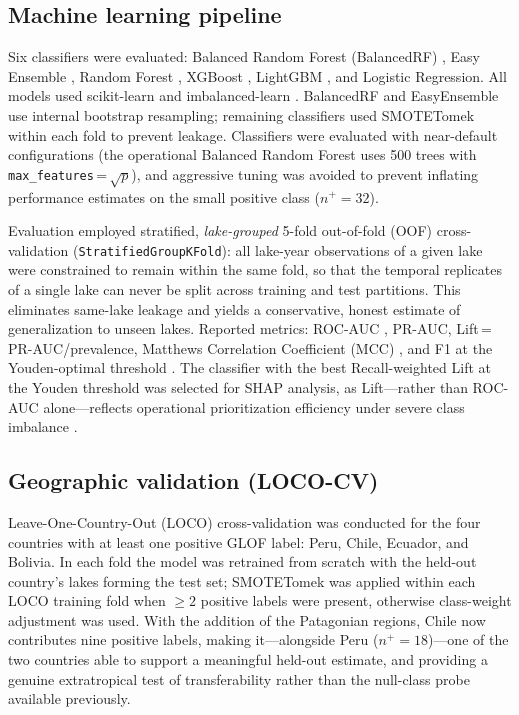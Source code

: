 \documentclass[pdflatex,sn-basic]{sn-jnl}%
\begin{document}
\subsection{Machine learning pipeline}\label{sec:pipeline}

Six classifiers were evaluated: Balanced Random Forest (BalancedRF)
\citep{Chen2004}, Easy Ensemble \citep{Liu2009}, Random Forest
\citep{Breiman2001}, XGBoost \citep{Chen2016}, LightGBM \citep{Ke2017},
and Logistic Regression. All models used scikit-learn
\citep{Pedregosa2011} and imbalanced-learn \citep{Lemaitre2017}.
BalancedRF and EasyEnsemble use internal bootstrap resampling;
remaining classifiers used SMOTETomek \citep{Chawla2002} within each
fold to prevent leakage. Classifiers were evaluated with near-default
configurations (the operational Balanced Random Forest uses 500 trees with
\texttt{max\_features}\,=\,$\sqrt{p}$), and aggressive tuning was avoided
to prevent inflating performance estimates on the small positive class
($n^+\!=\!32$).

Evaluation employed stratified, \emph{lake-grouped} 5-fold out-of-fold
(OOF) cross-validation (\texttt{StratifiedGroupKFold}): all lake-year
observations of a given lake were constrained to remain within the same
fold, so that the temporal replicates of a single lake can never be split
across training and test partitions. This eliminates same-lake leakage
and yields a conservative, honest estimate of generalization to unseen
lakes. Reported metrics:
ROC-AUC \citep{Hanley1982}, PR-AUC, Lift\,=\,PR-AUC/prevalence,
Matthews Correlation Coefficient (MCC) \citep{Chicco2020}, and F1 at
the Youden-optimal threshold \citep{Youden1950}. The classifier with the
best Recall-weighted Lift at the Youden threshold was selected for SHAP
analysis, as Lift---rather than ROC-AUC alone---reflects operational
prioritization efficiency under severe class imbalance \citep{Lobo2008}.

\subsection{Geographic validation (LOCO-CV)}

Leave-One-Country-Out (LOCO) cross-validation was conducted for the
four countries with at least one positive GLOF label: Peru, Chile,
Ecuador, and Bolivia. In each fold the model was retrained from scratch
with the held-out country's lakes forming the test set; SMOTETomek was
applied within each LOCO training fold when $\geq\!2$ positive labels were
present, otherwise class-weight adjustment was used. With the addition of
the Patagonian regions, Chile now contributes nine positive labels, making
it---alongside Peru ($n^+\!=\!18$)---one of the two countries able to
support a meaningful held-out estimate, and providing a genuine
extratropical test of transferability rather than the null-class probe
available previously.
\end{document}
